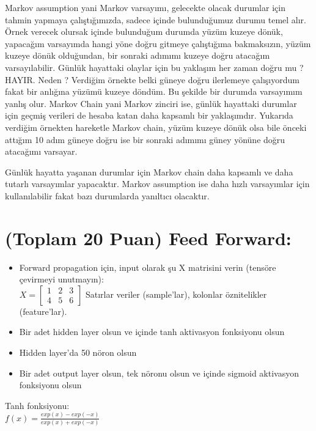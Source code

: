 \documentclass[11pt]{article}
\begin{document}
    Markov assumption yani Markov varsayımı, gelecekte olacak durumlar için tahmin yapmaya çalıştığımızda, sadece içinde bulunduğumuz durumu temel alır. Örnek verecek olursak içinde bulunduğum durumda yüzüm kuzeye dönük, yapacağım varsayımda hangi yöne doğru gitmeye çalıştığıma bakmaksızın, yüzüm kuzeye dönük olduğundan, bir sonraki adımımı kuzeye doğru atacağım varsayılabilir. Günlük hayattaki olaylar için bu yaklaşım her zaman doğru mu ? HAYIR. Neden ? Verdiğim örnekte belki güneye doğru ilerlemeye çalışıyordum fakat bir anlığına yüzümü kuzeye döndüm. Bu şekilde bir durumda varsayımım yanlış olur.
    Markov Chain yani Markov zinciri ise, günlük hayattaki durumlar için geçmiş verileri de hesaba katan daha kapsamlı bir yaklaşımdır. Yukarıda verdiğim örnekten hareketle Markov chain, yüzüm kuzeye dönük olsa bile önceki attığım 10 adım güneye doğru ise bir sonraki adımımı güney yönüne doğru atacağımı varsayar.

    Günlük hayatta yaşanan durumlar için Markov chain daha kapsamlı ve daha tutarlı varsayımlar yapacaktır. Markov assumption ise daha hızlı varsayımlar için kullanılabilir fakat bazı durumlarda yanıltıcı olacaktır.


\section{(Toplam 20 Puan) Feed Forward:}
 
\begin{itemize}
    \item Forward propagation için, input olarak şu X matrisini verin (tensöre çevirmeyi unutmayın):\\
    $X = \begin{bmatrix}
        1 & 2 & 3\\
        4 & 5 & 6
        \end{bmatrix}$
    Satırlar veriler (sample'lar), kolonlar öznitelikler (feature'lar).
    \item Bir adet hidden layer olsun ve içinde tanh aktivasyon fonksiyonu olsun
    \item Hidden layer'da 50 nöron olsun
    \item Bir adet output layer olsun, tek nöronu olsun ve içinde sigmoid aktivasyon fonksiyonu olsun
\end{itemize}

Tanh fonksiyonu:\\
$f(x) = \frac{exp(x) - exp(-x)}{exp(x) + exp(-x)}$
\vspace{.2in}
\end{document}

